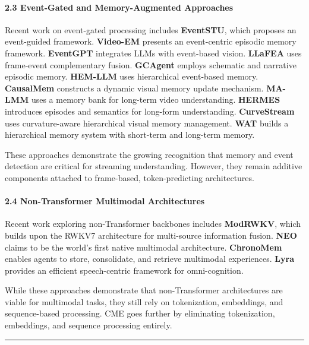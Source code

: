 \documentclass[
  11pt,
  a4paper,
]{article}
\begin{document}
\paragraph{2.3 Event-Gated and Memory-Augmented
Approaches}\label{event-gated-and-memory-augmented-approaches}

Recent work on event-gated processing includes \textbf{EventSTU}, which
proposes an event-guided framework. \textbf{Video-EM} presents an
event-centric episodic memory framework. \textbf{EventGPT} integrates
LLMs with event-based vision. \textbf{LLaFEA} uses frame-event
complementary fusion. \textbf{GCAgent} employs schematic and narrative
episodic memory. \textbf{HEM-LLM} uses hierarchical event-based memory.
\textbf{CausalMem} constructs a dynamic visual memory update mechanism.
\textbf{MA-LMM} uses a memory bank for long-term video understanding.
\textbf{HERMES} introduces episodes and semantics for long-form
understanding. \textbf{CurveStream} uses curvature-aware hierarchical
visual memory management. \textbf{WAT} builds a hierarchical memory
system with short-term and long-term memory.

These approaches demonstrate the growing recognition that memory and
event detection are critical for streaming understanding. However, they
remain additive components attached to frame-based, token-predicting
architectures.

\paragraph{2.4 Non-Transformer Multimodal
Architectures}\label{non-transformer-multimodal-architectures}

Recent work exploring non-Transformer backbones includes
\textbf{ModRWKV}, which builds upon the RWKV7 architecture for
multi-source information fusion. \textbf{NEO} claims to be the world's
first native multimodal architecture. \textbf{ChronoMem} enables agents
to store, consolidate, and retrieve multimodal experiences.
\textbf{Lyra} provides an efficient speech-centric framework for
omni-cognition.

While these approaches demonstrate that non-Transformer architectures
are viable for multimodal tasks, they still rely on tokenization,
embeddings, and sequence-based processing. CME goes further by
eliminating tokenization, embeddings, and sequence processing entirely.

\begin{center}\rule{0.5\linewidth}{0.5pt}\end{center}
\end{document}
